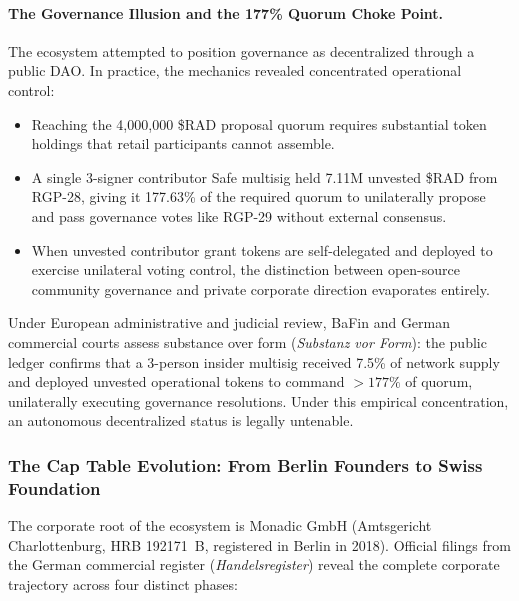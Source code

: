 \documentclass[a4paper,11pt,twoside,parskip=half-,headings=small]{scrartcl}
\begin{document}
\paragraph{The Governance Illusion and the 177\% Quorum Choke Point.}
The ecosystem attempted to position governance as decentralized through a public DAO. In practice, the mechanics revealed concentrated operational control:
\begin{itemize}[nosep]
  \item Reaching the 4,000,000 \$RAD proposal quorum requires substantial token holdings that retail participants cannot assemble.
  \item A single 3-signer contributor Safe multisig held 7.11M unvested \$RAD from RGP-28, giving it 177.63\% of the required quorum to unilaterally propose and pass governance votes like RGP-29 without external consensus.
  \item When unvested contributor grant tokens are self-delegated and deployed to exercise unilateral voting control, the distinction between open-source community governance and private corporate direction evaporates entirely.
\end{itemize}

Under European administrative and judicial review, BaFin and German commercial courts assess substance over form (\emph{Substanz vor Form}): the public ledger confirms that a 3-person insider multisig received 7.5\% of network supply and deployed unvested operational tokens to command $>177\%$ of quorum, unilaterally executing governance resolutions. Under this empirical concentration, an autonomous decentralized status is legally untenable.

\clearpage

\subsubsection{The Cap Table Evolution: From Berlin Founders to Swiss Foundation}
\label{sec:captable_evolution}

The corporate root of the ecosystem is Monadic GmbH (Amtsgericht Charlottenburg, HRB 192171~B, registered in Berlin in 2018). Official filings from the German commercial register (\emph{Handelsregister}) reveal the complete corporate trajectory across four distinct phases:
\end{document}
